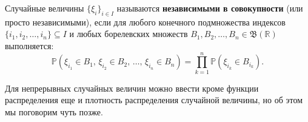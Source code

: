 \begin{definition}
Случайные величины $\{\xi_i\}_{i \in I}$ называются \textbf{независимыми в совокупности} (или просто независимыми), если для любого конечного подмножества индексов $\{i_1, i_2, \ldots, i_n\} \subseteq I$ и любых борелевских множеств $B_1, B_2, \ldots, B_n \in \mathfrak{B}(\mathbb{R})$ выполняется:
\[
\mathbb{P}(\xi_{i_1} \in B_1, \, \xi_{i_2} \in B_2, \, \ldots, \, \xi_{i_n} \in B_n) = \prod_{k=1}^{n} \mathbb{P}(\xi_{i_k} \in B_{i_k}).
\]
\end{definition}

\medskip

Для непрерывных случайных величин можно ввести кроме функции распределения еще и плотность распределения случайной величины, но об этом мы поговорим чуть позже.